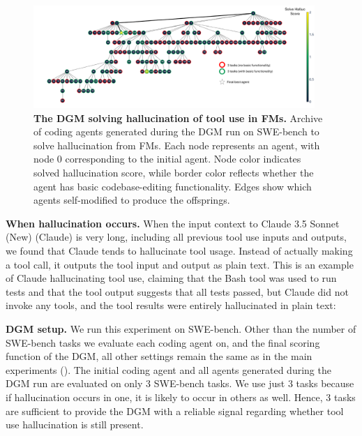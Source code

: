 \documentclass{article}
\begin{document}
\begin{figure}[H]
    \centering
    \includegraphics[width=0.95\textwidth]{solve_halluc/dgm_halluc.pdf}
    \caption{\textbf{The DGM solving hallucination of tool use in FMs.} Archive of coding agents generated during the DGM run on SWE-bench to solve hallucination from FMs. Each node represents an agent, with node 0 corresponding to the initial agent. Node color indicates solved hallucination score, while border color reflects whether the agent has basic codebase-editing functionality. Edges show which agents self-modified to produce the offsprings.}
    \label{fig:dgm-halluc}
\end{figure}

\textbf{When hallucination occurs.}
When the input context to Claude 3.5 Sonnet (New) (Claude) is very long, including all previous tool use inputs and outputs, we found that Claude tends to hallucinate tool usage. Instead of actually making a tool call, it outputs the tool input and output as plain text. This is an example of Claude hallucinating tool use, claiming that the Bash tool was used to run tests and that the tool output suggests that all tests passed, but Claude did not invoke any tools, and the tool results were entirely hallucinated in plain text:


\textbf{DGM setup.}
We run this experiment on SWE-bench. Other than the number of SWE-bench tasks we evaluate each coding agent on, and the final scoring function of the DGM, all other settings remain the same as in the main experiments (). The initial coding agent and all agents generated during the DGM run are evaluated on only 3 SWE-bench tasks. We use just 3 tasks because if hallucination occurs in one, it is likely to occur in others as well. Hence, 3 tasks are sufficient to provide the DGM with a reliable signal regarding whether tool use hallucination is still present.
\end{document}
